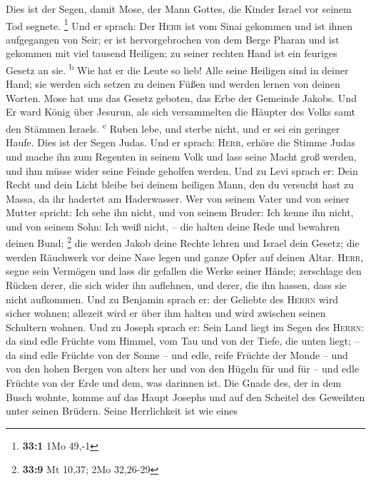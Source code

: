  Dies ist der Segen, damit Mose, der Mann Gottes, die
Kinder Israel vor seinem Tod segnete. \footnote{\textbf{33:1} 1Mo 49,-1}
 Und er sprach: Der \textsc{Herr} ist vom Sinai gekommen
und ist ihnen aufgegangen von Seir; er ist hervorgebrochen von dem Berge
Pharan und ist gekommen mit viel tausend Heiligen; zu seiner rechten
Hand ist ein feuriges Gesetz an sie. \textsuperscript{b} 
Wie hat er die Leute so lieb! Alle seine Heiligen sind in deiner Hand;
sie werden sich setzen zu deinen Füßen und werden lernen von deinen
Worten.  Mose hat uns das Gesetz geboten, das Erbe der
Gemeinde Jakobs.  Und Er ward König über Jesurun, als sich
versammelten die Häupter des Volks samt den Stämmen Israels.
\textsuperscript{c}  Ruben lebe, und sterbe nicht, und er
sei ein geringer Haufe.  Dies ist der Segen Judas. Und er
sprach: \textsc{Herr}, erhöre die Stimme Judas und mache ihn zum
Regenten in seinem Volk und lass seine Macht groß werden, und ihm müsse
wider seine Feinde geholfen werden.  Und zu Levi sprach
er: Dein Recht und dein Licht bleibe bei deinem heiligen Mann, den du
versucht hast zu Massa, da ihr hadertet am Haderwasser. 
Wer von seinem Vater und von seiner Mutter spricht: Ich sehe ihn nicht,
und von seinem Bruder: Ich kenne ihn nicht, und von seinem Sohn: Ich
weiß nicht, -- die halten deine Rede und bewahren deinen Bund;
\footnote{\textbf{33:9} Mt 10,37; 2Mo 32,26-29}  die
werden Jakob deine Rechte lehren und Israel dein Gesetz; die werden
Räuchwerk vor deine Nase legen und ganze Opfer auf deinen Altar.
 \textsc{Herr}, segne sein Vermögen und lass dir gefallen
die Werke seiner Hände; zerschlage den Rücken derer, die sich wider ihn
auflehnen, und derer, die ihn hassen, dass sie nicht aufkommen.
 Und zu Benjamin sprach er: der Geliebte des
\textsc{Herrn} wird sicher wohnen; allezeit wird er über ihm halten und
wird zwischen seinen Schultern wohnen.  Und zu Joseph
sprach er: Sein Land liegt im Segen des \textsc{Herrn}: da sind edle
Früchte vom Himmel, vom Tau und von der Tiefe, die unten liegt; --
 da sind edle Früchte von der Sonne -- und edle, reife
Früchte der Monde --  und von den hohen Bergen von alters
her und von den Hügeln für und für --  und edle Früchte
von der Erde und dem, was darinnen ist. Die Gnade des, der in dem Busch
wohnte, komme auf das Haupt Josephs und auf den Scheitel des Geweihten
unter seinen Brüdern.  Seine Herrlichkeit ist wie eines
